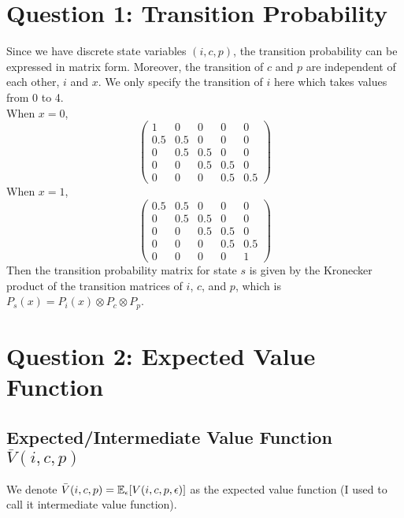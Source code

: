 \documentclass[12pt]{article}[margin=1in]
\begin{document}
\section{Question 1: Transition Probability}
Since we have discrete state variables $(i,c,p)$, the transition probability
can be expressed in matrix form. Moreover, the transition of $c$ and $p$ are
independent of each other, $i$ and $x$. We only specify the transition of $i$
here which takes values from 0 to 4. \\ When $x = 0$,
\begin{equation}\label{eq:trans0}
    \begin{pmatrix}
        1   & 0   & 0   & 0   & 0   \\
        0.5 & 0.5 & 0   & 0   & 0   \\
        0   & 0.5 & 0.5 & 0   & 0   \\
        0   & 0   & 0.5 & 0.5 & 0   \\
        0   & 0   & 0   & 0.5 & 0.5
    \end{pmatrix}
\end{equation}
When $x = 1$,
\begin{equation}\label{eq:trans1}
    \begin{pmatrix}
        0.5 & 0.5 & 0   & 0   & 0   \\
        0   & 0.5 & 0.5 & 0   & 0   \\
        0   & 0   & 0.5 & 0.5 & 0   \\
        0   & 0   & 0   & 0.5 & 0.5 \\
        0   & 0   & 0   & 0   & 1
    \end{pmatrix}
\end{equation}
Then the transition probability matrix for state $s$ is given by the Kronecker product of the transition matrices of $i$, $c$, and $p$, which is $P_s(x) = P_i(x) \otimes P_c \otimes P_p$.
\section{Question 2: Expected Value Function}
\subsection{Expected/Intermediate Value Function $\bar{V}(i,c,p)$}
We denote $\bar{V}(i,c,p) = \mathbb{E}_{\epsilon}[V(i,c,p,\epsilon)]$ as the expected value function (I used to call it intermediate value function).
\end{document}
